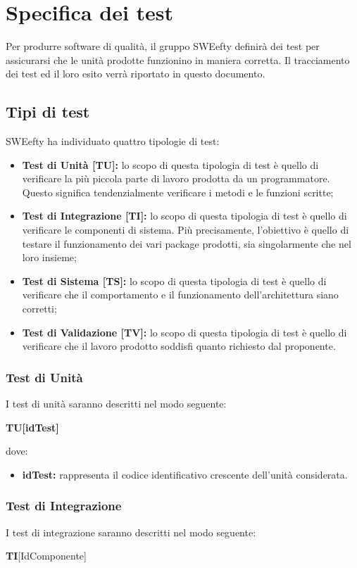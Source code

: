 \section{Specifica dei test}
Per produrre software di qualità, il gruppo SWEefty definirà dei test per assicurarsi che le unità prodotte funzionino in maniera corretta. Il tracciamento dei test ed il loro esito verrà riportato in questo documento.
	\subsection{Tipi di test}
	SWEefty ha individuato quattro tipologie di test: \Spazio
	\begin{itemize}
		\item {\textbf{Test di Unità [TU]:} lo scopo di questa tipologia di test è quello di verificare la più piccola parte di lavoro prodotta da un programmatore. Questo significa tendenzialmente verificare i metodi e le funzioni scritte; }
		\item {\textbf{Test di Integrazione [TI]:} lo scopo di questa tipologia di test è quello di verificare le componenti di sistema. Più	precisamente, l’obiettivo è quello di testare il funzionamento dei vari package prodotti, sia singolarmente che nel loro insieme; }
		\item {\textbf{Test di Sistema [TS]:} lo scopo di questa tipologia di test è quello di verificare che il comportamento e il funzionamento dell’architettura siano corretti;}
		\item {\textbf{Test di Validazione [TV]:} lo scopo di questa tipologia di test è quello di verificare che il lavoro prodotto soddisfi quanto richiesto dal proponente. }
	\end{itemize} 
		
	\subsubsection{Test di Unità}
	I test di unità saranno descritti nel modo seguente: \Spazio

	\centerline{\textbf{TU[idTest]}}
	
	dove:
	\begin{itemize}
		\item \textbf{idTest:} rappresenta il codice identificativo crescente dell’unità considerata.
	\end{itemize}
	
	\subsubsection{Test di Integrazione}
	I test di integrazione saranno descritti nel modo seguente: \Spazio
	\centerline{\textbf{TI}[IdComponente]}
	
